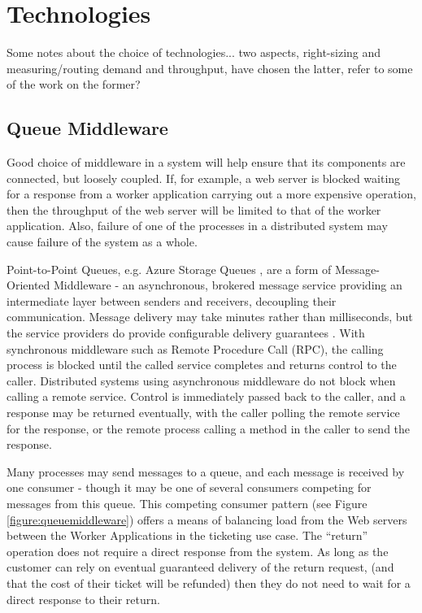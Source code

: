 %
%

\section{Technologies}\label{sec:technologies}
\begin{shaded}
Some notes about the choice of technologies... two aspects, right-sizing and measuring/routing demand and throughput, have chosen the latter, refer to some of the work on the former?
\end{shaded}

%
%

\subsection{Queue Middleware}\label{sec:middleware}

Good choice of middleware in a system will help ensure that its components are connected, but loosely coupled.  If, for example, a web server is blocked waiting for a response from a worker application carrying out a more expensive operation, then the throughput of the web server will be limited to that of the worker application.  Also, failure of one of the processes in a distributed system may cause failure of the system as a whole.

Point-to-Point Queues, e.g. Azure Storage Queues \cite{RN1072}, are a form of Message-Oriented Middleware - an asynchronous, brokered message service providing an intermediate layer between senders and receivers, decoupling their communication.  Message delivery may take minutes rather than milliseconds, but the service providers do provide configurable delivery guarantees \cite{RN65}.  With synchronous middleware such as Remote Procedure Call (RPC), the calling process is blocked until the called service completes and returns control to the caller.  Distributed systems using asynchronous middleware do not block when calling a remote service.  Control is immediately passed back to the caller, and a response may be returned eventually, with the caller polling the remote service for the response, or the remote process calling a method in the caller to send the response.

Many processes may send messages to a queue, and each message is received by one consumer - though it may be one of several consumers competing for messages from this queue.  This competing consumer pattern (see Figure \ref{figure:queuemiddleware}) offers a means of balancing load from the Web servers between the Worker Applications in the ticketing use case.  The ``return'' operation does not require a direct response from the system.  As long as the customer can rely on eventual guaranteed delivery of the return request, (and that the cost of their ticket will be refunded) then they do not need to wait for a direct response to their return.

